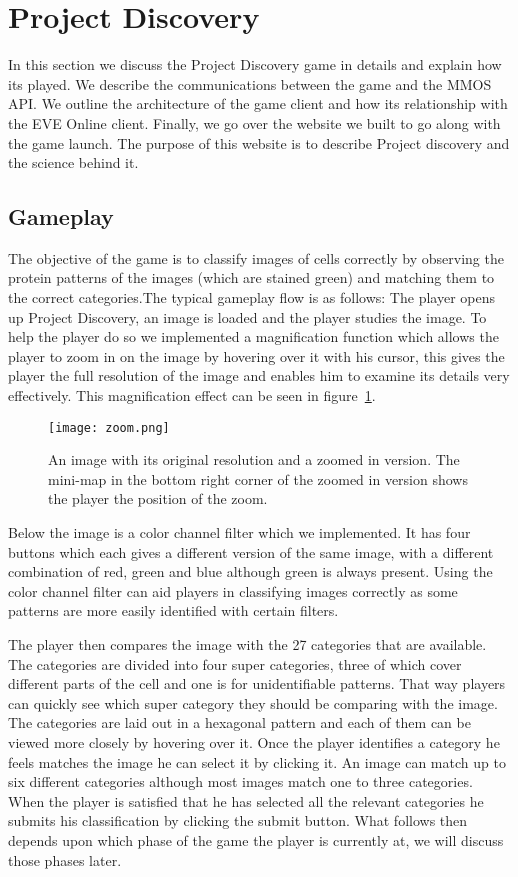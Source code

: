 \section{Project Discovery}\label{sec:projectdiscovery}
In this section we discuss the Project Discovery game in details and explain how its played. We describe the communications between the game and the MMOS API. We outline the architecture of the game client and how its relationship with the EVE Online client. Finally, we go over the website we built to go along with the game launch. The purpose of this website is to describe Project discovery and the science behind it.

\subsection{Gameplay}
The objective of the game is to classify images of cells correctly by observing the protein patterns of the images (which are stained green) and matching them to the correct categories.The typical gameplay flow is as follows: The player opens up Project Discovery, an image is loaded and the player studies the image. To help the player do so we implemented a magnification function which allows the player to zoom in on the image by hovering over it with his cursor, this gives the player the full resolution of the image and enables him to examine its details very effectively. This magnification effect can be seen in figure~\ref{fig:zoom}.

\begin{figure}[H]
\centering
\graphicspath{ {./graphics/} }
\centerline{\texttt{[image: zoom.png]}}
\caption{\label{fig:zoom}An image with its original resolution and a zoomed in version. The mini-map in the bottom right corner of the zoomed in version shows the player the position of the zoom.}
\end{figure}

Below the image is a color channel filter which we implemented. It has four buttons which each gives a different version of the same image, with a different combination of red, green and blue although green is always present. Using the color channel filter can aid players in classifying images correctly as some patterns are more easily identified with certain filters.

The player then compares the image with the 27 categories that are available. The categories are divided into four super categories, three of which cover different parts of the cell and one is for unidentifiable patterns. That way players can quickly see which super category they should be comparing with the image. The categories are laid out in a hexagonal pattern and each of them can be viewed more closely by hovering over it. Once the player identifies a category he feels matches the image he can select it by clicking it. An image can match up to six different categories although most images match one to three categories. When the player is satisfied that he has selected all the relevant categories he submits his classification by clicking the submit button. What follows then depends upon which phase of the game the player is currently at, we will discuss those phases later.

